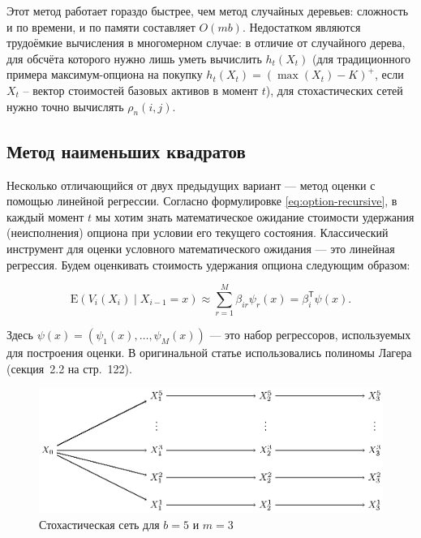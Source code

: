 \documentclass[specialist,
               substylefile = ../spbu.rtx,
               subf,href,colorlinks=true, 12pt]{disser}
\newcommand{\E}{\mathrm{E}}
\begin{document}
Этот метод работает гораздо быстрее, чем метод случайных деревьев: сложность и по времени, и по памяти составляет $O(mb)$. Недостатком являются трудоёмкие вычисления в многомерном случае: в отличие от случайного дерева, для обсчёта которого нужно лишь уметь вычислить $h_t(X_t)$ (для традиционного примера максимум-опциона на покупку $h_t(X_t) = \left(\max(X_t) - K\right)^+$, если $X_t$ -- вектор стоимостей базовых активов в момент $t$), для стохастических сетей нужно точно вычислять $\rho_n(i, j)$.


\subsection{Метод наименьших квадратов} %
\label{sub:least_squares}

Несколько отличающийся от двух предыдущих вариант --- метод оценки с помощью линейной регрессии. Согласно формулировке \eqref{eq:option-recursive}, в каждый момент $t$ мы хотим знать математическое ожидание стоимости удержания (неисполнения) опциона при условии его текущего состояния. Классический инструмент для оценки условного математического ожидания --- это линейная регрессия. Будем оценкивать стоимость удержания опциона следующим образом:

$$\E\left(V_i(X_i)\middle\vert X_{i-1} = x\right) \approx \sum_{r=1}^M \beta_{ir} \psi_r(x) = \beta_i^\mathsf{T}\psi(x).$$

Здесь $\psi(x) = \left(\psi_1(x), \dots, \psi_M(x)\right)$ --- это набор регрессоров, используемых для построения оценки. В оригинальной статье \cite{Longstaff2001} использовались полиномы Лагера (секция~2.2 на стр.~122).

\begin{figure}[h]
    \centering
	\includegraphics{stohastic_mesh_vector_phase_0.eps}
	\caption{Стохастическая сеть для $b = 5$ и $m = 3$}
	\label{fig:least_squares}
\end{figure}
\end{document}
